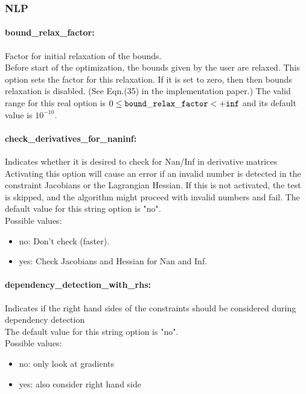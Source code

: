 \subsubsection{NLP}
\label{sec:NLP}

\paragraph{bound\_relax\_factor:}\label{sec:bound_relax_factor} Factor for initial relaxation of the bounds. $\;$ \\
 Before start of the optimization, the bounds
given by the user are relaxed.  This option sets
the factor for this relaxation.  If it is set to
zero, then then bounds relaxation is disabled.
(See Eqn.(35) in the implementation paper.) The valid range for this real option is 
$0 \le {\tt bound\_relax\_factor } <  {\tt +inf}$
and its default value is $10^{-10}$.


\paragraph{check\_derivatives\_for\_naninf:}\label{sec:check_derivatives_for_naninf} Indicates whether it is desired to check for Nan/Inf in derivative matrices $\;$ \\
 Activating this option will cause an error if an
invalid number is detected in the constraint
Jacobians or the Lagrangian Hessian.  If this is
not activated, the test is skipped, and the
algorithm might proceed with invalid numbers and
fail.
The default value for this string option is "no".
\\ 
Possible values:
\begin{itemize}
   \item no: Don't check (faster).
   \item yes: Check Jacobians and Hessian for Nan and Inf.
\end{itemize}

\paragraph{dependency\_detection\_with\_rhs:}\label{sec:dependency_detection_with_rhs} Indicates if the right hand sides of the constraints should be considered during dependency detection $\;$ \\
The default value for this string option is "no".
\\ 
Possible values:
\begin{itemize}
   \item no: only look at gradients
   \item yes: also consider right hand side
\end{itemize}

